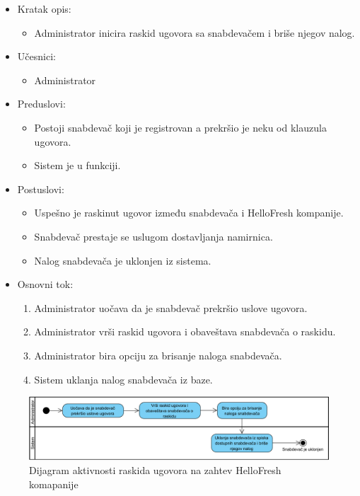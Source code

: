 \begin{itemize}
    \item Kratak opis:
        \begin{itemize}
            \item Administrator inicira raskid ugovora sa snabdevačem i briše njegov nalog.
        \end{itemize}
    \item Učesnici:
        \begin{itemize}
            \item Administrator
        \end{itemize}
    \item Preduslovi:
        \begin{itemize}
            \item Postoji snabdevač koji je registrovan a prekršio je neku od klauzula ugovora.
            \item Sistem je u funkciji.
        \end{itemize}
    \item Postuslovi:
        \begin{itemize}
            \item Uspešno je raskinut ugovor između snabdevača i HelloFresh kompanije.
            \item Snabdevač prestaje se uslugom dostavljanja namirnica.
            \item Nalog snabdevača je uklonjen iz sistema.
        \end{itemize}
    \item Osnovni tok:
        \begin{enumerate}
            \item Administrator uočava da je snabdevač prekršio uslove ugovora.
            \item Administrator vrši raskid ugovora i obaveštava snabdevača o raskidu.
            \item Administrator bira opciju za brisanje naloga snabdevača.
            \item Sistem uklanja nalog snabdevača iz baze.
        \end{enumerate}
\end{itemize}

\begin{figure}[H]
\begin{center}
\includegraphics[width=\textwidth]{Pictures/activity_supplier_contract_termination_2.png}
\end{center}
    \caption{Dijagram aktivnosti raskida ugovora na zahtev HelloFresh komapanije}
\label{fig:ActivitySupplierContractTermination2}
\end{figure}